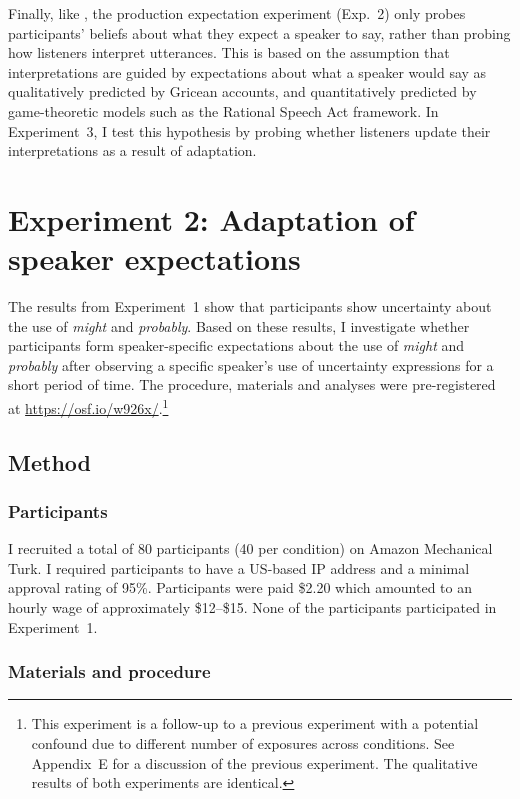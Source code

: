 Finally, like \textcite{Yildirim2016}, the production expectation experiment (Exp.~2) only probes participants' beliefs about what they expect a speaker to say, rather than probing 
how listeners interpret utterances.
This is based on the assumption that interpretations are guided by expectations about what a speaker would say as qualitatively predicted by Gricean accounts, and quantitatively
predicted by game-theoretic models such as the Rational Speech Act framework. In Experiment~3, I test this hypothesis by probing whether listeners 
update their interpretations as a result of adaptation.

\section{Experiment 2: Adaptation of speaker expectations}
\label{sec:exp-prod-adaptation}

The results from Experiment~1 show that participants show uncertainty about the
use of \textit{might} and \textit{probably}. Based on these results, I investigate whether participants
form speaker-specific expectations about the use of \textit{might} and \textit{probably} after observing a specific speaker's use of 
uncertainty expressions for a short period of time. The procedure, materials and analyses were pre-registered at \url{https://osf.io/w926x/}.\footnote{This experiment is a follow-up to a previous experiment with a potential confound due to different number of exposures across conditions. See Appendix~E for a discussion of the previous experiment. The qualitative results of both experiments are identical.}


\subsection{Method}

\subsubsection{Participants}
I recruited a total of 80 participants (40 per condition) on Amazon Mechanical Turk. 
I required participants to have a US-based IP address and a minimal approval rating 
of 95\%. Participants were paid \$2.20 which amounted to an hourly wage of approximately 
\$12--\$15. None of the participants participated in Experiment~1.

\subsubsection{Materials and procedure}

